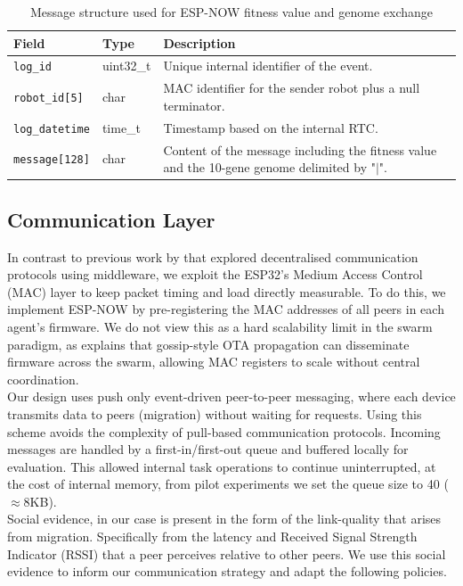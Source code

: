 \documentclass[conference]{IEEEtran}
\begin{document}
\begin{table}[H]
  \centering
  \caption{Message structure used for ESP-NOW fitness value and genome exchange}
  \label{tab:out_message}
  \begin{tabular}{l l p{4cm}}
    \toprule
    \textbf{Field} & \textbf{Type} & \textbf{Description} \\
    \midrule
    \texttt{log\_id} & uint32\_t & Unique internal identifier of the event.\\
    \texttt{robot\_id[5]} & char & MAC identifier for the sender robot plus a null terminator.\\
    \texttt{log\_datetime} & time\_t & Timestamp based on the internal RTC.\\
    \texttt{message[128]} & char & Content of the message including the fitness value and the 10-gene genome delimited by "$|$".\\
    \bottomrule
  \end{tabular}
\end{table}

\subsection{Communication Layer}\label{sec:comm-layer}

In contrast to previous work by \cite{rabbah_real_2021} that explored decentralised communication protocols using middleware, we exploit the ESP32's Medium Access Control (MAC) layer to keep  packet timing and load directly measurable. To do this, we implement ESP-NOW by pre-registering the MAC addresses of all peers in each agent's firmware. We do not view this as a hard scalability limit in the swarm paradigm, as \cite{varadharajan_over--air_2018} explains that gossip-style OTA propagation can disseminate firmware across the swarm, allowing MAC registers to scale without central coordination. \\

Our design uses push only event-driven peer-to-peer messaging, where each device transmits data to peers (migration) without waiting for requests. Using this scheme avoids the complexity of pull-based communication protocols. Incoming messages are handled by a first-in/first-out queue and buffered locally for evaluation. This allowed internal task operations to continue uninterrupted, at the cost of internal memory, from pilot experiments we set the queue size to 40 ($\approx$8KB). \\

Social evidence, in our case is present in the form of the link-quality that arises from migration. Specifically from the latency and Received Signal Strength Indicator (RSSI) that a peer perceives relative to other peers. We use this social evidence to inform our communication strategy and adapt the following policies. \\
\end{document}
